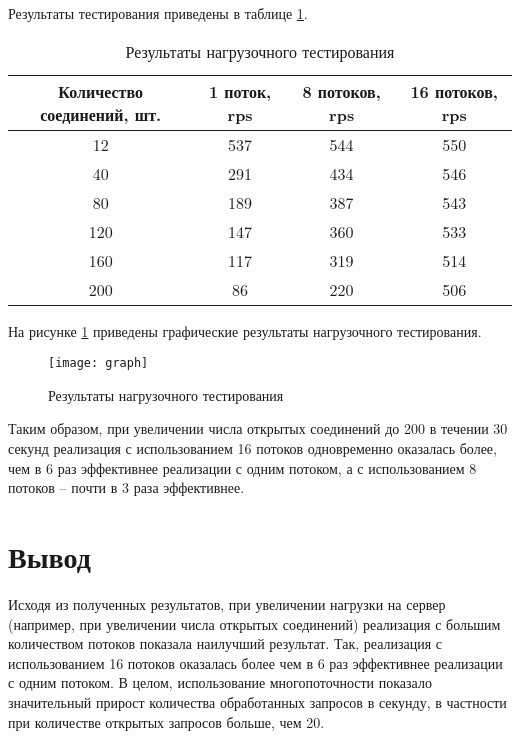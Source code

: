 Результаты тестирования приведены в таблице \ref{tbl:rps}.
\begin{table}[h]
	\begin{center}
		\begin{threeparttable}
		\captionsetup{justification=raggedright,singlelinecheck=off}
		\caption{Результаты нагрузочного тестирования}
		\label{tbl:rps}
		\begin{tabular}{|c|c|c|c|}
			\hline
			Количество соединений, шт.& 1 поток, rps&  8 потоков, rps &  16 потоков, rps \\
			\hline
			12 & 537 & 544 & 550 \\ 
			\hline
			40 & 291 & 434 & 546 \\ 
			\hline
			80 & 189 & 387 & 543 \\ 
			\hline
			120 & 147 & 360 & 533 \\ 
			\hline
			160 & 117 & 319 & 514 \\ 
			\hline
			200 & 86 & 220 & 506 \\ 
			\hline
		\end{tabular}
		\end{threeparttable}
    \end{center}
\end{table}

На рисунке \ref{img:graph} приведены графические результаты нагрузочного тестирования.

\begin{figure}[h]
	\begin{center}
		\texttt{[image: graph]}
	\end{center}
	\caption{Результаты нагрузочного тестирования}
	\label{img:graph}
\end{figure}
Таким образом, при увеличении числа открытых соединений до 200 в течении 30 секунд реализация с использованием 16 потоков одновременно оказалась более, чем в 6 раз эффективнее реализации с одним потоком, а с использованием 8 потоков -- почти в 3 раза эффективнее.

\section*{Вывод}
Исходя из полученных результатов, при увеличении нагрузки на сервер (например, при увеличении числа открытых соединений) реализация с большим количеством потоков показала наилучший результат. Так, реализация с использованием 16 потоков оказалась более чем в 6 раз эффективнее реализации с одним потоком.
В целом, использование многопоточности показало значительный прирост количества обработанных запросов в секунду, в частности при количестве открытых запросов больше, чем 20.